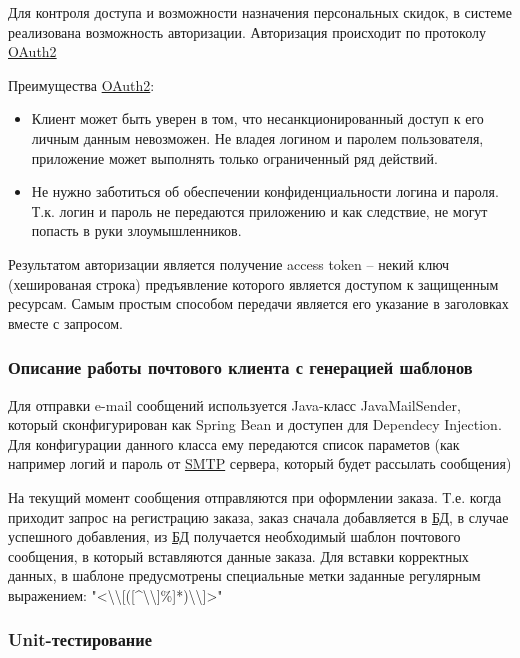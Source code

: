 Для контроля доступа и возможности назначения персональных скидок, в системе реализована возможность авторизации. Авторизация происходит по протоколу \hyperlink{gloss:oauth}{OAuth2}

Преимущества \hyperlink{gloss:oauth}{OAuth2}:
\begin{itemize}
    \item Клиент может быть уверен в том, что несанкционированный доступ к его личным данным невозможен.
    Не владея логином и паролем пользователя, приложение может выполнять только ограниченный ряд действий.
    \item Не нужно заботиться об обеспечении конфиденциальности логина и пароля.
    Т.к. логин и пароль не передаются приложению и как следствие, не могут попасть в руки злоумышленников.
\end{itemize}

Результатом авторизации является получение access token – некий ключ (хешированая строка) предъявление которого является доступом к защищенным ресурсам.
Самым простым способом передачи является его указание в заголовках вместе с запросом.

\subsubsection{Описание работы почтового клиента с генерацией шаблонов}\indent

Для отправки e-mail сообщений используется Java-класс JavaMailSender, который сконфигурирован как Spring Bean и доступен для Dependecy Injection.
Для конфигурации данного класса ему передаются список параметов (как например логий и пароль от \hyperlink{gloss:smtp}{SMTP} сервера, который будет рассылать сообщения)

На текущий момент сообщения отправляются при оформлении заказа.
Т.е. когда приходит запрос на регистрацию заказа, заказ сначала добавляется в \hyperlink{gloss:db}{БД}, 
в случае успешного добавления, из \hyperlink{gloss:db}{БД} получается необходимый шаблон почтового сообщения, в который вставляются данные заказа.
Для вставки корректных данных, в шаблоне предусмотрены специальные метки заданные регулярным выражением: 
"<\textbackslash\textbackslash[([\textasciicircum\textbackslash\textbackslash]\%]*)\textbackslash\textbackslash]>"

\subsubsection{Unit-тестирование}\indent

